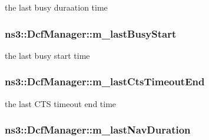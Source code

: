 the last busy duraation time 

\subsubsection[{\texorpdfstring{m\+\_\+last\+Busy\+Start}{m_lastBusyStart}}]{ ns3\+::\+Dcf\+Manager\+::m\+\_\+last\+Busy\+Start\hspace{0.3cm}{\ttfamily [private]}}\hypertarget{classns3_1_1DcfManager_a0f8af7e80b542ad84de4f9275e41806b}{}\label{classns3_1_1DcfManager_a0f8af7e80b542ad84de4f9275e41806b}


the last busy start time 

\subsubsection[{\texorpdfstring{m\+\_\+last\+Cts\+Timeout\+End}{m_lastCtsTimeoutEnd}}]{ ns3\+::\+Dcf\+Manager\+::m\+\_\+last\+Cts\+Timeout\+End\hspace{0.3cm}{\ttfamily [private]}}\hypertarget{classns3_1_1DcfManager_abeffda3976f92d50616835e3b8b34e32}{}\label{classns3_1_1DcfManager_abeffda3976f92d50616835e3b8b34e32}


the last C\+TS timeout end time 

\subsubsection[{\texorpdfstring{m\+\_\+last\+Nav\+Duration}{m_lastNavDuration}}]{ ns3\+::\+Dcf\+Manager\+::m\+\_\+last\+Nav\+Duration\hspace{0.3cm}{\ttfamily [private]}}\hypertarget{classns3_1_1DcfManager_ac1345fd3e89ee2e0acb0665082669af7}{}\label{classns3_1_1DcfManager_ac1345fd3e89ee2e0acb0665082669af7}


